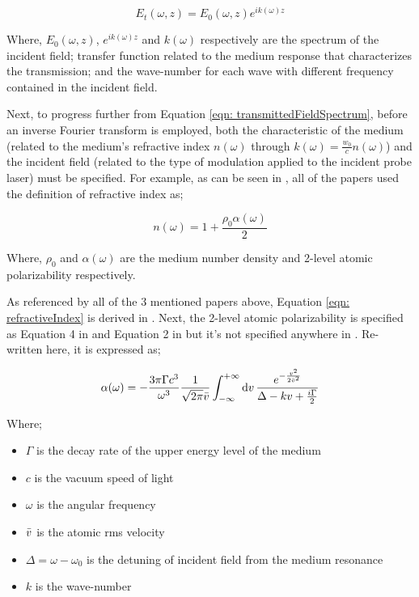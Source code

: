 \begin{equation}
    E_{t}(\omega, z) = E_{0}(\omega, z) e^{ik(\omega)z}
    \label{eqn: transmittedFieldSpectrum}
\end{equation}

Where, $E_{0}(\omega, z)$, $e^{ik(\omega)z}$ and $k(\omega)$ respectively are the spectrum of the incident field; transfer function related to the medium response that characterizes the transmission; and the wave-number for each wave with different frequency contained in the incident field.

Next, to progress further from Equation \ref{eqn: transmittedFieldSpectrum}, before an inverse Fourier transform is employed, both the characteristic of the medium (related to the medium's refractive index $n(\omega)$ through $k(\omega) = \frac{w_{0}}{c} n(\omega)$) and the incident field (related to the type of modulation applied to the incident probe laser) must be specified. For example, as can be seen in \cite{Chalony2011, Kwong2014, Kwong2015}, all of the papers used the definition of refractive index as;

\begin{equation}
    n(\omega) = 1 + \frac{\rho_{0} \alpha(\omega)}{2}
    \label{eqn: refractiveIndex}
\end{equation}

Where, $\rho_{0}$ and $\alpha(\omega)$ are the medium number density and 2-level atomic polarizability respectively.

As referenced by all of the 3 mentioned papers above, Equation \ref{eqn: refractiveIndex} is derived in \cite{hecht1974optics}. Next, the 2-level atomic polarizability is specified as Equation 4 in \cite{Kwong2014} and Equation 2 in \cite{Kwong2015} but it's not specified anywhere in \cite{Chalony2011}. Re-written here, it is expressed as;

\begin{equation}
    \alpha(\omega) = -\frac{3\pi\Gamma c^{3}}{\omega^{3}} \frac{1}{\sqrt{2\pi}\Bar{v}} \int_{-\infty}^{+\infty} \dd{v} \frac{e^{-\frac{v^{2}}{2\Bar{v}^{2}}}}{\Delta - kv + \frac{i\Gamma}{2}}
    \label{eqn: alphaGeneral}
\end{equation}

Where;

\begin{itemize}
    \item $\Gamma$ is the decay rate of the upper energy level of the medium
    \item $c$ is the vacuum speed of light
    \item $\omega$ is the angular frequency
    \item $\Bar{v}$ is the atomic rms velocity 
    \item $\Delta = \omega - \omega_{0}$ is the detuning of incident field from the medium resonance
    \item $k$ is the wave-number
\end{itemize}

